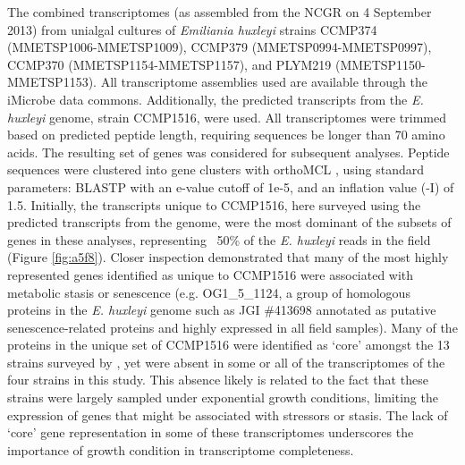 The combined transcriptomes (as assembled from the NCGR on 4 September 2013) from unialgal cultures of \textit{Emiliania huxleyi} strains CCMP374 (MMETSP1006-MMETSP1009), CCMP379 (MMETSP0994-MMETSP0997), CCMP370 (MMETSP1154-MMETSP1157), and PLYM219 (MMETSP1150-MMETSP1153). All transcriptome assemblies used are available through the iMicrobe data commons. Additionally, the predicted transcripts from the \textit{E. huxleyi} genome, strain CCMP1516, were used. All transcriptomes were trimmed based on predicted peptide length, requiring sequences be longer than 70 amino acids. The resulting set of genes was considered for subsequent analyses. Peptide sequences were clustered into gene clusters with orthoMCL \citep{Li2003}, using standard parameters: BLASTP with an e-value cutoff of 1e-5, and an inflation value (-I) of 1.5. Initially, the transcripts unique to CCMP1516, here surveyed using the predicted transcripts from the genome, were the most dominant of the subsets of genes in these analyses, representing ~50\% of the \textit{E. huxleyi} reads in the field (Figure \ref{fig:a5f8}). Closer inspection demonstrated that many of the most highly represented genes identified as unique to CCMP1516 were associated with metabolic stasis or senescence (e.g. OG1\_5\_1124, a group of homologous proteins in the \textit{E. huxleyi} genome such as JGI \#413698 annotated as putative senescence-related proteins and highly expressed in all field samples). Many of the proteins in the unique set of CCMP1516 were identified as `core' amongst the 13 strains surveyed by \citet{Read2013}, yet were absent in some or all of the transcriptomes of the four strains in this study. This absence likely is related to the fact that these strains were largely sampled under exponential growth conditions, limiting the expression of genes that might be associated with stressors or stasis. The lack of `core' gene representation in some of these transcriptomes underscores the importance of growth condition in transcriptome completeness.\par

